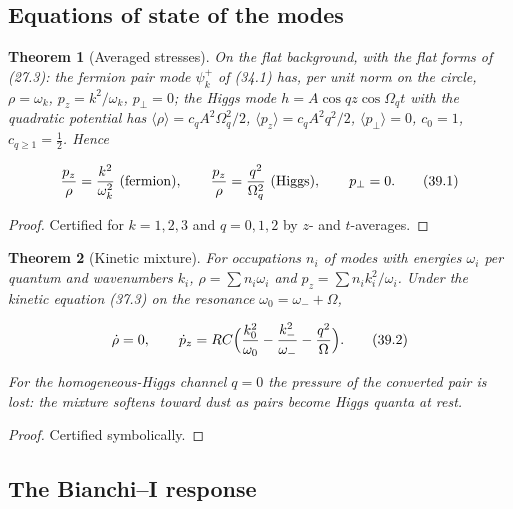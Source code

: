 \documentclass[11pt]{article}
\newtheorem{theorem}{Theorem}[section]
\theoremstyle{remark}
\begin{document}
\subsection{Equations of state of the modes}

\begin{theorem}[Averaged stresses]
\label{thm:v20v36-eos}
On the flat background, with the flat forms of (27.3): the fermion
pair mode \(\psi_k^+\) of (34.1) has, per unit norm on the circle,
\(\rho=\omega_k\), \(p_z=k^2/\omega_k\), \(p_\perp=0\); the Higgs mode
\(h=A\cos qz\cos\Omega_qt\) with the quadratic potential has
\(\langle\rho\rangle=c_qA^2\Omega_q^2/2\), \(\langle p_z\rangle=c_qA^2q^2/2\),
\(\langle p_\perp\rangle=0\), \(c_0=1\), \(c_{q\ge1}=\tfrac12\).  Hence

\[
 \frac{p_z}\rho=\frac{k^2}{\omega_k^2}\ \hbox{(fermion)},\qquad
 \frac{p_z}\rho=\frac{q^2}{\Omega_q^2}\ \hbox{(Higgs)},\qquad p_\perp=0.
                                                                    \tag{39.1}
\]
\end{theorem}

\begin{proof}
Certified for \(k=1,2,3\) and \(q=0,1,2\) by \(z\)- and \(t\)-averages.
\end{proof}

\begin{theorem}[Kinetic mixture]
\label{thm:v20v36-mixture}
For occupations \(n_i\) of modes with energies \(\omega_i\) per quantum
and wavenumbers \(k_i\), \(\rho=\sum n_i\omega_i\) and
\(p_z=\sum n_ik_i^2/\omega_i\).  Under the kinetic equation (37.3) on the
resonance \(\omega_0=\omega_-+\Omega\),

\[
 \dot\rho=0,\qquad \dot p_z=RC\Bigl(\frac{k_0^2}{\omega_0}-\frac{k_-^2}{\omega_-}-\frac{q^2}\Omega\Bigr).
                                                                    \tag{39.2}
\]

For the homogeneous-Higgs channel \(q=0\) the pressure of the
converted pair is lost: the mixture softens toward dust as pairs
become Higgs quanta at rest.
\end{theorem}

\begin{proof}
Certified symbolically.
\end{proof}

\subsection{The Bianchi--I response}
\end{document}
